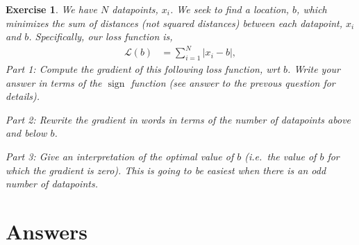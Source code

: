 \documentclass{article}
\newtheorem{exercise}{Exercise}
\renewcommand{\L}{\mathcal{L}}
\begin{document}
\begin{exercise}
  We have $N$ datapoints, $x_i$.
  We seek to find a location, $b$, which minimizes the sum of distances (not squared distances) between each datapoint, $x_i$ and $b$.
  Specifically, our loss function is,
  \begin{align}
    \L(b) &= \sum_{i=1}^N |x_i - b|,
  \end{align}
  Part 1: Compute the gradient of this following loss function, wrt $b$.  Write your answer in terms of the $\operatorname{sign}$ function (see answer to the prevous question for details).

  Part 2: Rewrite the gradient in words in terms of the number of datapoints above and below $b$.

  Part 3: Give an interpretation of the optimal value of $b$ (i.e.\ the value of $b$ for which the gradient is zero).  This is going to be easiest when there is an odd number of datapoints.
\end{exercise}

\section{Answers}
\end{document}
